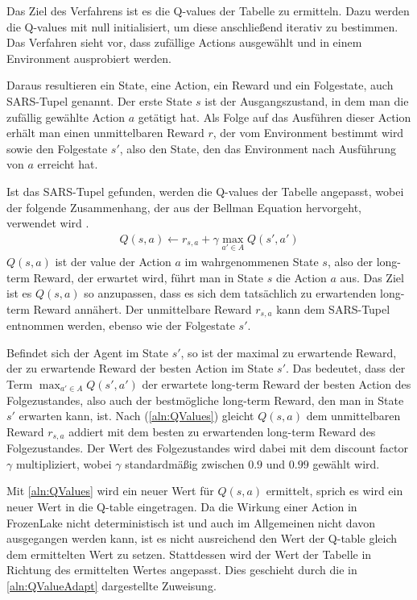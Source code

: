 \documentclass[11pt]{scrartcl}
\begin{document}
\noindent
Das Ziel des Verfahrens ist es die Q-values der Tabelle zu ermitteln. Dazu werden die
Q-values mit null initialisiert, um diese anschließend iterativ zu bestimmen. Das Verfahren
sieht vor, dass zufällige Actions ausgewählt und in einem Environment ausprobiert werden.

Daraus resultieren ein State, eine Action, ein Reward und ein Folgestate, auch SARS-Tupel
genannt. Der erste State $s$ ist der Ausgangszustand, in dem man die zufällig gewählte
Action $a$ getätigt hat. Als Folge auf das Ausführen dieser Action erhält man einen
unmittelbaren Reward $r$, der vom Environment bestimmt wird sowie den Folgestate $s'$,
also den State, den das Environment nach Ausführung von $a$ erreicht hat.

Ist das SARS-Tupel gefunden, werden die Q-values der Tabelle angepasst, wobei der folgende
Zusammenhang, der aus der Bellman Equation hervorgeht, verwendet wird
\cite[~S.193 ff.]{L2018}.
\begin{align}
  Q(s, a) \leftarrow r_{s,a} + \gamma \max_{a' \in A}Q(s', a')
  \label{aln:QValues}
\end{align}
\noindent
$Q(s, a)$ ist der value der Action $a$ im wahrgenommenen State $s$, also der long-term
Reward, der erwartet wird, führt man in State $s$ die Action $a$ aus. Das Ziel ist es
$Q(s, a)$ so anzupassen, dass es sich dem tatsächlich zu erwartenden long-term Reward
annähert. Der unmittelbare Reward $r_{s,a}$ kann dem SARS-Tupel entnommen werden, ebenso
wie der Folgestate $s'$.

Befindet sich der Agent im State $s'$, so ist der maximal zu erwartende Reward, der 
zu erwartende Reward der besten Action im State $s'$. Das bedeutet, dass der Term
$\max_{a'\in A} Q(s', a')$ der erwartete long-term Reward der besten Action des
Folgezustandes, also auch der bestmögliche long-term Reward, den man in State $s'$
erwarten kann, ist. Nach (\ref{aln:QValues}) gleicht $Q(s, a)$ dem unmittelbaren Reward
$r_{s,a}$ addiert mit dem besten zu erwartenden long-term Reward des Folgezustandes. Der
Wert des Folgezustandes wird dabei mit dem discount factor $\gamma$ multipliziert, wobei 
$\gamma$ standardmäßig zwischen $0.9$ und $0.99$ gewählt wird.

Mit \autoref{aln:QValues} wird ein neuer Wert für $Q(s, a)$ ermittelt, sprich es wird ein
neuer Wert in die Q-table eingetragen. Da die Wirkung einer Action in FrozenLake nicht
deterministisch ist und auch im Allgemeinen nicht davon ausgegangen werden kann, ist es
nicht ausreichend den Wert der Q-table gleich dem ermittelten Wert zu setzen. Stattdessen
wird der Wert der Tabelle in Richtung des ermittelten Wertes angepasst. Dies geschieht durch 
die in \autoref{aln:QValueAdapt} dargestellte Zuweisung.
\end{document}
